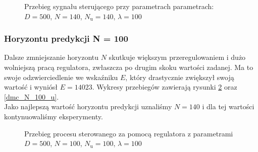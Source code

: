 \begin{figure}[b]
    \centering
    \caption{Przebieg sygnału sterującego przy parametrach parametrach: $D = 500$, $N = 140$, $N_{\mathrm{u}} = 140$, $\lambda = 100$}
    \label{dmc_N_140_u}
\end{figure}

\subsubsection{Horyzontu predykcji N = 100}
Dalsze zmniejszanie horyzontu $N$ skutkuje większym przeregulowaniem i dużo wolniejszą pracą regulatora, zwłaszcza po drugim skoku wartości zadanej. Ma to swoje odzwierciedlenie we wskaźniku $E$, który drastycznie zwiększył swoją wartość i wyniósł $E = 14023$. Wykresy przebiegów zawierają rysunki \ref{dmc_N_100_y} oraz \ref{dmc_N_100_u}.\\
\indent{} Jako najlepszą wartość horyzontu predykcji uznaliśmy $N = 140$ i dla tej wartości kontynuowaliśmy eksperymenty.

\begin{figure}[t]
    \centering
    \caption{Przebieg procesu sterowanego za pomocą regulatora z parametrami $D = 500$, $N = 100$, $N_{\mathrm{u}} = 100$, $\lambda = 100$}
    \label{dmc_N_100_y}
\end{figure}

